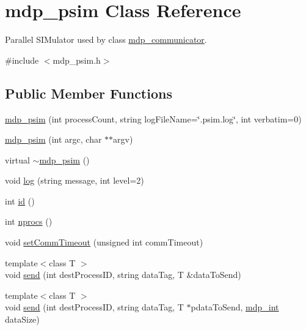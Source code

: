 \hypertarget{classmdp__psim}{}\section{mdp\+\_\+psim Class Reference}
\label{classmdp__psim}


Parallel S\+I\+Mulator used by class \hyperlink{classmdp__communicator}{mdp\+\_\+communicator}.  




{\ttfamily \#include $<$mdp\+\_\+psim.\+h$>$}

\subsection*{Public Member Functions}
\begin{DoxyCompactItemize}
\item 
\hyperlink{classmdp__psim_aa3fd4da678b802e5f0d53787bec3f331}{mdp\+\_\+psim} (int process\+Count, string log\+File\+Name=\char`\"{}.psim.\+log\char`\"{}, int verbatim=0)
\item 
\hyperlink{classmdp__psim_af5320c53d620c8c66f1842cd6b546bf6}{mdp\+\_\+psim} (int argc, char $\ast$$\ast$argv)
\item 
virtual \hyperlink{classmdp__psim_ac6b26c66968872c6f6d71dff2bf0527f}{$\sim$mdp\+\_\+psim} ()
\item 
void \hyperlink{classmdp__psim_ab3b24379c623c72635210d348399414e}{log} (string message, int level=2)
\item 
int \hyperlink{classmdp__psim_add120eb0aa77a4b73d0844eda58b0570}{id} ()
\item 
int \hyperlink{classmdp__psim_a6377b54cc52e570452c048e5a97b8030}{nprocs} ()
\item 
void \hyperlink{classmdp__psim_a1bbcfd250b4df9520ae4ff07fefe9204}{set\+Comm\+Timeout} (unsigned int comm\+Timeout)
\item 
{\footnotesize template$<$class T $>$ }\\void \hyperlink{classmdp__psim_a43b6a0b7423f588033d17f49eddf37e1}{send} (int dest\+Process\+ID, string data\+Tag, T \&data\+To\+Send)
\item 
{\footnotesize template$<$class T $>$ }\\void \hyperlink{classmdp__psim_ad63a6e9cb4f1ca2d7f75e34b03dc7da4}{send} (int dest\+Process\+ID, string data\+Tag, T $\ast$pdata\+To\+Send, \hyperlink{mdp__global__vars_8h_aaa1ad9d0dcd2124aa5af0120d9954174}{mdp\+\_\+int} data\+Size)
\item 
$$
\end{DoxyCompactItemize}
